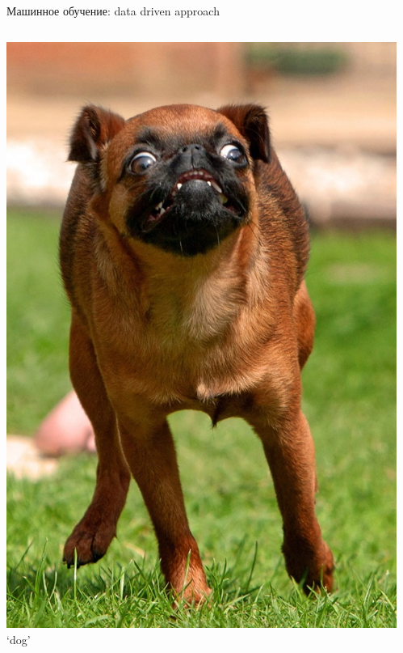 \documentclass[aspectratio=169, professionalfonts]{beamer}
\begin{document}
\begin{frame}{Машинное обучение: data driven approach}
\begin{columns}
\begin{column}{.1\linewidth}
            \includegraphics[width=\linewidth]{figures/fig36-dataset-sample.jpg}
            `dog'
        \end{column}
        \begin{column}{.1\linewidth}
            \centering

\end{column}
\end{columns}
\end{frame}
\end{document}
